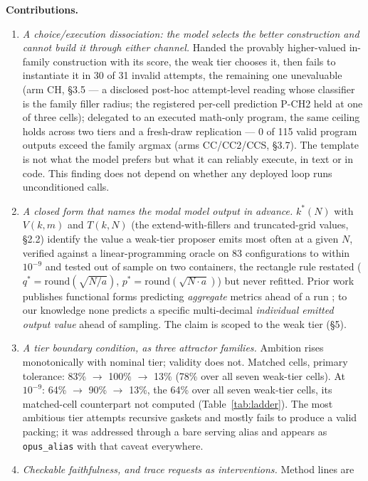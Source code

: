 \textbf{Contributions.}
\begin{enumerate}
\item \emph{A choice/execution dissociation: the model selects the better construction and cannot build it through either channel.} Handed the provably higher-valued in-family construction with its score, the weak tier chooses it, then fails to instantiate it in 30 of 31 invalid attempts, the remaining one unevaluable (arm CH, \S3.5 --- a disclosed post-hoc attempt-level reading whose classifier is the family filler radius; the registered per-cell prediction P-CH2 held at one of three cells); delegated to an executed math-only program, the same ceiling holds across two tiers and a fresh-draw replication --- 0 of 115 valid program outputs exceed the family argmax (arms CC/CC2/CCS, \S3.7). The template is not what the model prefers but what it can reliably execute, in text or in code. This finding does not depend on whether any deployed loop runs unconditioned calls.
\item \emph{A closed form that names the modal model output in advance.} $k^*(N)$ with $V(k, m)$ and
$T(k, N)$ (the extend-with-fillers and truncated-grid values, \S2.2) identify the value a weak-tier
proposer emits most often at a given $N$, verified against a linear-programming oracle on 83
configurations to within $10^{-9}$ and tested out of sample on two containers, the rectangle rule
restated ($q^* = \mathrm{round}(\sqrt{N/a})$, $p^* = \mathrm{round}(\sqrt{N \cdot a})$) but never
refitted. Prior work publishes functional forms predicting \emph{aggregate} metrics ahead of a run
\citep{kaplan2020scalinglawsneurallanguage,hoffmann2022trainingcomputeoptimallargelanguage,snell2024predictingemergentcapabilitiesfinetuning};
to our knowledge none predicts a specific multi-decimal \emph{individual emitted output value}
ahead of sampling. The claim is scoped to the weak tier (\S5).
\item \emph{A tier boundary condition, as three attractor families.} Ambition rises monotonically
with nominal tier; validity does not. Matched cells, primary tolerance: 83\% $\rightarrow$ 100\%
$\rightarrow$ 13\% (78\% over all seven weak-tier cells). At $10^{-9}$: 64\% $\rightarrow$ 90\%
$\rightarrow$ 13\%, the 64\% over all seven weak-tier cells, its matched-cell counterpart not
computed (Table~\ref{tab:ladder}). The most ambitious tier attempts recursive gaskets and mostly
fails to produce a valid packing; it was addressed through a bare serving alias and appears as
\texttt{opus\_alias} with that caveat everywhere.
\item \emph{Checkable faithfulness, and trace requests as interventions.} Method lines are

\end{enumerate}
